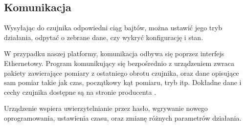 	\subsection{Komunikacja}
	Wysyłając do czujnika odpowiedni ciąg bajtów, można ustawić jego tryb działania, odpytać o zebrane dane, czy wykryć konfigurację i stan.

	W przypadku naszej platformy, komunikacja odbywa się poprzez interfejs Ethernetowy.
	Program komunikujący się bezpośrednio z urządzeniem zwraca pakiety zawierające pomiary z ostatniego obrotu czujnika, oraz dane 
	opisujące sam pomiar takie jak czas, początkowy kąt pomiaru, tryb itp.
	Dokładne dane i cechy czujnika dostępne są na stronie producenta \cite{sick_website}.

	Urządzenie wspiera uwierzytelnianie przez hasło, wgrywanie nowego oprogramowania,
	ustawienia czasu, oraz zmianę różnych parametrów działania.

